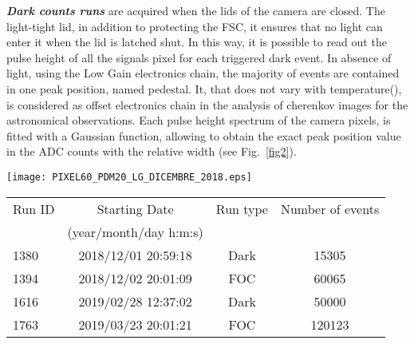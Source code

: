 \textbf{\textit{Dark counts runs}} are acquired
when the lids of the camera are closed.
The light-tight lid, in addition to protecting the FSC, it ensures that no light
can enter it when the lid is latched shut. In this way, it is possible to read out
the pulse height of all the signals pixel for each triggered dark event.
In absence of light, using the Low Gain electronics chain, the majority of events are 
contained in one peak position, named pedestal. 
It, that does not vary with temperature(\cite{Impiombato2016}), is considered as offset electronics chain in the analysis of cherenkov images for the astronomical
observations.
Each pulse height spectrum of the camera pixels, is fitted with a Gaussian function, allowing to obtain the exact peak position value in the ADC counts with the relative width (see Fig.~\ref{fig2}).





\begin{figure*}[h!!]
\centering
\texttt{[image: PIXEL60\_PDM20\_LG\_DICEMBRE\_2018.eps]}
\vspace{0.5cm}
\caption{ Single photo-electron peak spectrum for a camera pixel taken in peak detector mode in one of the Dark run listed in 
Table~\ref{table2}. The black curve represents the distribution of the peak detector
output and the red curve shows the corresponding Gaussian fit.}
\label{fig2}
\end{figure*}
\label{subs:skydata}





\begin{table*}[htbp!!]
\centering
\caption{ASTRI-Horn FOC/Dark runs}
\label{table2}
\begin{tabular}{lccc}
\hline\hline
Run ID & Starting Date & Run type      & Number of events \\
               & (year/month/day h:m:s)   \\
\hline     
1380 & 2018/12/01 20:59:18  &   Dark    & 15305      \\
1394 & 2018/12/02 20:01:09  &   FOC     & 60065     \\
1616 & 2019/02/28 12:37:02  &   Dark    & 50000     \\
1763 & 2019/03/23 20:01:21  &   FOC     & 120123    \\
  

\hline\hline
\end{tabular}
\end{table*}
